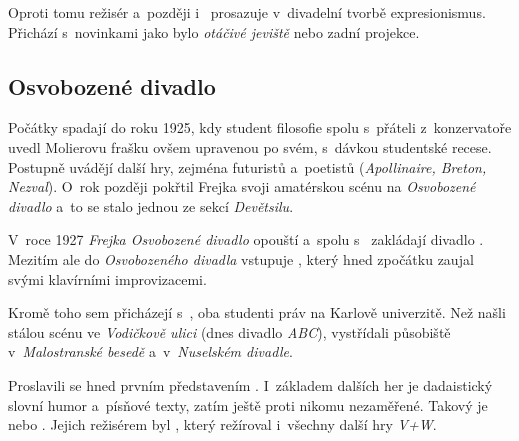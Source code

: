 Oproti tomu režisér  a~později
i~ 
prosazuje v~divadelní tvorbě expresionismus. Přichází s~novinkami jako
bylo \emph{otáčivé jeviště} nebo zadní projekce.

\subsection*{Osvobozené divadlo}
Počátky  spadají do roku
1925, kdy student filosofie  spolu s~přáteli
z~konzervatoře uvedl Molierovu frašku  ovšem
upravenou po svém, s~dávkou studentské recese. Postupně uvádějí další
hry, zejména futuristů a~poetistů (\emph{Apollinaire, Breton, Nezval}).
O~rok později pokřtil Frejka svoji amatérskou scénu na \emph{Osvobozené
divadlo} a~to se stalo jednou ze sekcí \emph{Devětsilu}.

V~roce 1927 \emph{Frejka Osvobozené divadlo} opouští a~spolu
s~ zakládají
divadlo . Mezitím ale do \emph{Osvobozeného
divadla} vstupuje , který hned zpočátku zaujal
svými klavírními improvizacemi.

Kromě toho sem přicházejí  s~,  oba studenti práv na Karlově univerzitě. Než
našli stálou scénu ve \emph{Vodičkově ulici} (dnes divadlo \emph{ABC}),
vystřídali působiště v~\emph{Malostranské besedě} a~v~\emph{Nuselském divadle}. 

Proslavili se hned prvním představením .
I~základem dalších her je dadaistický slovní humor a~písňové texty, zatím
ještě proti nikomu nezaměřené. Takový je 
  nebo . Jejich
režisérem byl , který režíroval i~všechny další
hry \emph{V+W}.

